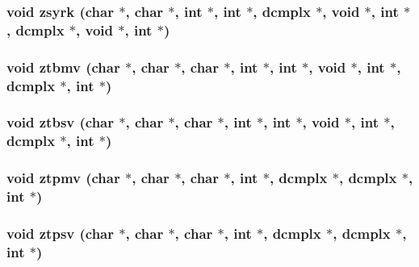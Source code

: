 \subsubsection{\setlength{\rightskip}{0pt plus 5cm}void zsyrk (char $\ast$, char $\ast$, int $\ast$, int $\ast$, {\bf dcmplx} $\ast$, void $\ast$, int $\ast$, {\bf dcmplx} $\ast$, void $\ast$, int $\ast$)}\label{essl_8h_b1a87d7b245581f3c2a0fdefb6059516}


\subsubsection{\setlength{\rightskip}{0pt plus 5cm}void ztbmv (char $\ast$, char $\ast$, char $\ast$, int $\ast$, int $\ast$, void $\ast$, int $\ast$, {\bf dcmplx} $\ast$, int $\ast$)}\label{essl_8h_10e102e73265bdc519cdad07958dfe38}


\subsubsection{\setlength{\rightskip}{0pt plus 5cm}void ztbsv (char $\ast$, char $\ast$, char $\ast$, int $\ast$, int $\ast$, void $\ast$, int $\ast$, {\bf dcmplx} $\ast$, int $\ast$)}\label{essl_8h_5ddaba38bd8ff42b13c4af23a9209d06}


\subsubsection{\setlength{\rightskip}{0pt plus 5cm}void ztpmv (char $\ast$, char $\ast$, char $\ast$, int $\ast$, {\bf dcmplx} $\ast$, {\bf dcmplx} $\ast$, int $\ast$)}\label{essl_8h_d6b6ac76fc625472fc7b5a0e62c43925}


\subsubsection{\setlength{\rightskip}{0pt plus 5cm}void ztpsv (char $\ast$, char $\ast$, char $\ast$, int $\ast$, {\bf dcmplx} $\ast$, {\bf dcmplx} $\ast$, int $\ast$)}\label{essl_8h_4084b3538fe4be89c47ea91c1e399689}


